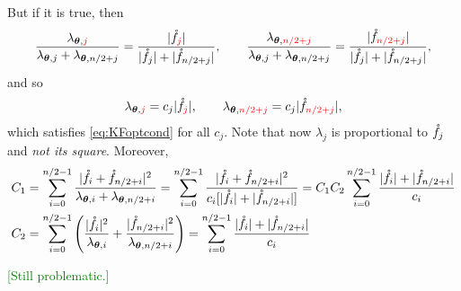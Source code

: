 \documentclass{amsart}
\begin{document}
But if it is true, then 
\begin{equation*}
\frac{\lambda_{\boldsymbol{\theta},{\textcolor{red}{j}}}}{\lambda_{\boldsymbol{\theta},j} + \lambda_{\boldsymbol{\theta},n/2+j}} = \frac{\lvert \mathring{f}_{\textcolor{red}{j}} \rvert }{\lvert \mathring{f}_{j} \rvert + \lvert \mathring{f}_{n/2+j} \rvert}, \qquad 
\frac{\lambda_{\boldsymbol{\theta},{\textcolor{red}{n/2+j}}}}{\lambda_{\boldsymbol{\theta},j} + \lambda_{\boldsymbol{\theta},n/2+j}} = \frac{\lvert \mathring{f}_{\textcolor{red}{n/2+j}} \rvert}{\lvert \mathring{f}_{j} \rvert + \lvert \mathring{f}_{n/2+j} \rvert},
\end{equation*}
and so
\begin{equation*}
\lambda_{\boldsymbol{\theta},{\textcolor{red}{j}}} =  c_j \lvert \mathring{f}_{\textcolor{red}{j}} \rvert, \qquad 
\lambda_{\boldsymbol{\theta},{\textcolor{red}{n/2+j}}}= c_j \lvert \mathring{f}_{\textcolor{red}{n/2+j}} \rvert,
\end{equation*}
which satisfies \eqref{eq:KFoptcond} for all $c_j$.  
Note that now $\lambda_j$ is proportional to $\mathring{f}_j$ and \emph{not its square}.
Moreover,
\begin{align*}
    C_1 & = \sum_{i=0}^{n/2-1} \frac{\lvert \mathring{f}_i + \mathring{f}_{n/2+i} \rvert^2}{\lambda_{\boldsymbol{\theta},i} + \lambda_{\boldsymbol{\theta},n/2+i}} 
    = \sum_{i=0}^{n/2-1} \frac{\lvert \mathring{f}_i + \mathring{f}_{n/2+i} \rvert^2}
    {c_i [\lvert \mathring{f}_i \rvert + \lvert \mathring{f}_{n/2+i} \rvert] } 
    = C_1C_2 \sum_{i=0}^{n/2-1} \frac{\lvert \mathring{f}_i \rvert + \lvert \mathring{f}_{n/2+i} \rvert}
    {c_i} \\
    C_2 &= \sum_{i=0}^{n/2-1} \left(\frac{\lvert \mathring{f}_i \rvert^2}{\lambda_{\boldsymbol{\theta},i}} + \frac{\lvert \mathring{f}_{n/2+i} \rvert^2}{\lambda_{\boldsymbol{\theta},n/2+i}} \right) 
    = \sum_{i=0}^{n/2-1} \frac{\lvert \mathring{f}_i \rvert + \lvert \mathring{f}_{n/2+i} \rvert} {c_i} 
\end{align*}

\textcolor{green}{[Still problematic.]}





\iffalse
\end{document}
